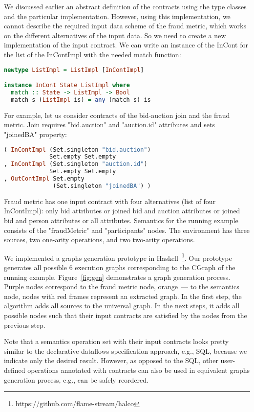We discussed earlier an abstract definition of the contracts using the type classes and the particular implementation. 
However, using this implementation, we cannot describe the required input data scheme of the fraud metric, which works on the different alternatives of the input data.
So we need to create a new implementation of the input contract.
We can write an instance of the InCont for the list of the InContImpl with the needed match function:

\begin{lstlisting}[language=Haskell]
newtype ListImpl = ListImpl [InContImpl]

instance InCont State ListImpl where
  match :: State -> ListImpl -> Bool
  match s (ListImpl is) = any (match s) is
\end{lstlisting}

For example, let us consider contracts of the bid-auction join and the fraud metric.
Join requires "bid.auction" and "auction.id" attributes and sets "joinedBA" property:
\begin{lstlisting}[language=Haskell]
( InContImpl (Set.singleton "bid.auction")
             Set.empty Set.empty
, InContImpl (Set.singleton "auction.id")
             Set.empty Set.empty
, OutContImpl Set.empty
              (Set.singleton "joinedBA") )
\end{lstlisting}

Fraud metric has one input contract with four alternatives (list of four InContImpl):
only bid attributes
or joined bid and auction attributes
or joined bid and person attributes
or all attributes.
Semantics for the running example consists of the "fraudMetric" and "participants" nodes.
The environment has three sources, two one-arity operations, and two two-arity operations.

We implemented a graphs generation prototype in Haskell~\footnote{https://github.com/flame-stream/halco}.
Our prototype generates all possible 6 execution graphs corresponding to the CGraph of the running example. Figure~\ref{fig:gen} demonstrates a graph generation process.
Purple nodes correspond to the fraud metric node, orange~--- to the semantics node, nodes with red frames represent an extracted graph.
In the first step, the algorithm adds all sources to the universal graph.
In the next steps, it adds all possible nodes such that their input contracts are satisfied by the nodes from the previous step. 

Note that a semantics operation set with their input contracts looks pretty similar to the declarative dataflows specification approach, e.g., SQL, because we indicate only the desired result.
However, as opposed to the SQL, other user-defined operations annotated with contracts can also be used in equivalent graphs generation process, e.g., can be safely reordered.

